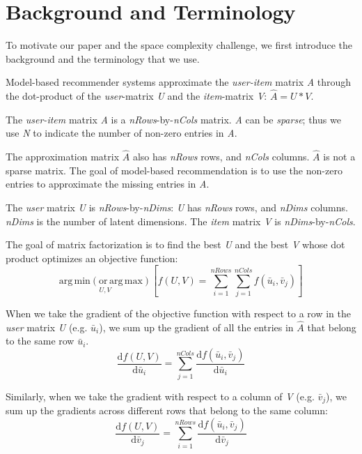 \section{Background and Terminology}
To motivate our paper and the space complexity challenge, we first introduce the background and the terminology that we use.  


Model-based recommender systems approximate the \emph{user-item} matrix \emph{A} through 
the dot-product of the \emph{user}-matrix \emph{U} and the \emph{item}-matrix \emph{V}: $\hat{A} = U * V.$  

The \emph{user-item} matrix \emph{A} is a \emph{nRows}-by-\emph{nCols} matrix.
\emph{A} can be \emph{sparse}; thus we use \emph{N} to indicate the number of non-zero entries in \emph{A}.

The approximation matrix $\hat{A}$ also has \emph{nRows} rows, and \emph{nCols} columns.  
$\hat{A}$ is not a sparse matrix.  The goal of model-based recommendation is to use the non-zero entries to approximate the missing entries in \emph{A}. 

The \emph{user} matrix \emph{U} is \emph{nRows}-by-\emph{nDims}: \emph{U} has \emph{nRows} rows, and \emph{nDims} columns.  
\emph{nDims} is the number of latent dimensions.  
The \emph{item} matrix \emph{V} is \emph{nDims}-by-\emph{nCols}.  


The goal of matrix factorization is to find the best \emph{U} and the best \emph{V} whose dot product optimizes an objective function:
\begin{equation} \label{eq:argmin}
\operatorname*{arg\,min (or\,arg\,max)}_{U,V} \left[ f(U, V) = \sum_{i=1}^{nRows} \sum_{j=1}^{nCols} f(\bar{u}_{i}, \bar{v}_{j}) \right]
\end{equation}

When we take the gradient of the objective function with respect to a row in the \emph{user} matrix \emph{U} (e.g. $\bar{u}_{i}$), 
we sum up the gradient of all the entries in $\hat{A}$ that belong to the same row $\bar{u}_{i}$.  
\begin{equation} \label{eq:gradU}
\frac{\text{d}f(U,V)}{\text{d}\bar{u}_i} = \sum_{j=1}^{nCols} \frac{\text{d}f(\bar{u}_i,\bar{v}_j)}{\text{d}\bar{u}_i}
\end{equation}

Similarly, when we take the gradient with respect to a column of \emph{V} (e.g. $\bar{v}_{j}$), we sum up the gradients across different rows that belong to the same column: 
\begin{equation} \label{eq:gradV}
\frac{\text{d}f(U,V)}{\text{d}\bar{v}_j} = \sum_{i=1}^{nRows} \frac{\text{d}f(\bar{u}_i,\bar{v}_j)}{\text{d}\bar{v}_j}
\end{equation}

